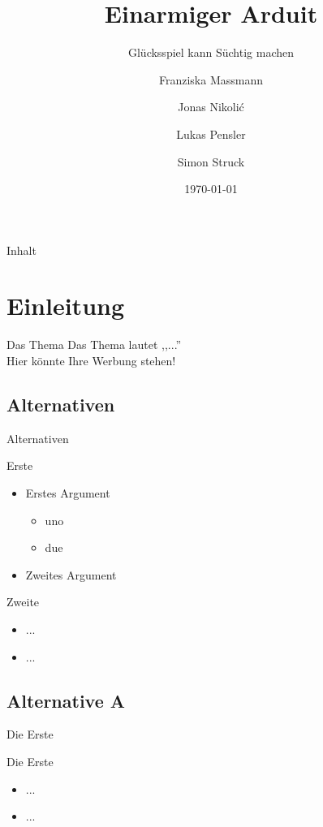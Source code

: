 \documentclass[mathserif,9pt]{beamer}
\title[Einarmiger Arduit]{Einarmiger Arduit}
\subtitle{Gl\"ucksspiel kann S\"uchtig machen}
\author{Franziska Massmann \and Jonas Nikolić \and Lukas Pensler \and Simon Struck}
\institute{FB Technik | Abteilung Elektrotechnik und Informatik}
\date{\today}
\begin{document}
	\titleframe		%
	
	\begin{frame}{Inhalt}
			\tableofcontents%
	\end{frame}

	\section{Einleitung}
		\begin{frame}{}
			\begin{block}{Das Thema}
				Das Thema lautet ,,...''\\
				Hier könnte Ihre Werbung stehen!
			\end{block}
		\end{frame}
	
		\subsection{Alternativen}
			\begin{frame}{Alternativen}
				\begin{block}{Erste}
					\begin{itemize}
						\item Erstes Argument
							\begin{itemize}
							\item uno
							\item due
							\end{itemize}
						\item Zweites Argument
					\end{itemize}
				\end{block}
				
				\begin{block}{Zweite}
					\begin{itemize}
						\item ...
						\item ...
					\end{itemize}
				\end{block}
				
			\end{frame}

		\subsection{Alternative A}
			\begin{frame}{Die Erste}
				\begin{block}{Die Erste}
					\begin{itemize}
						\item ...
						\item ...
					\end{itemize}
				\end{block}
			\end{frame}
\end{document}
